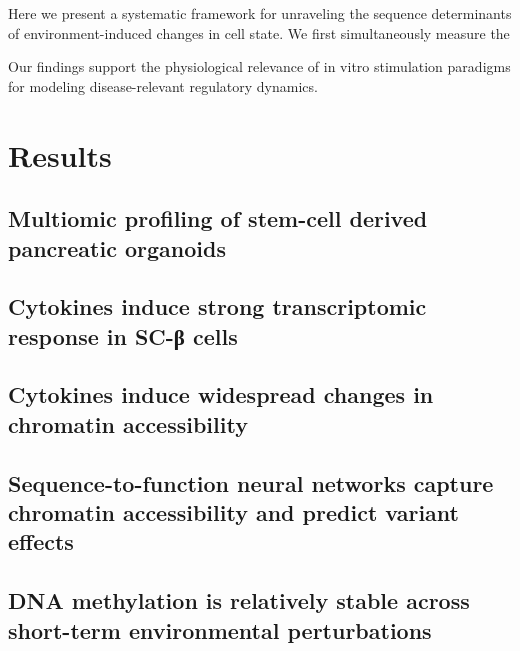 Here we present a systematic framework for unraveling the sequence determinants of environment-induced changes in cell state. We first simultaneously measure the 

Our findings support the physiological relevance of in vitro stimulation paradigms for modeling disease-relevant regulatory dynamics.


\section{Results}

\subsection{Multiomic profiling of stem-cell derived pancreatic organoids}

\subsection{Cytokines induce strong transcriptomic response in SC-β cells}

\subsection{Cytokines induce widespread changes in chromatin accessibility}

\subsection{Sequence-to-function neural networks capture chromatin accessibility and predict variant effects}

\subsection{DNA methylation is relatively stable across short-term environmental perturbations}